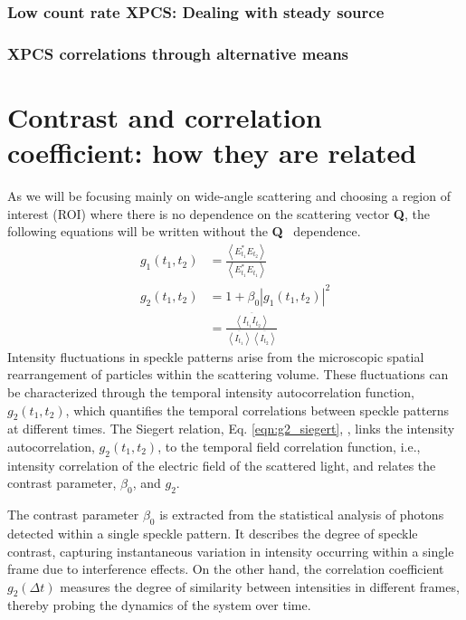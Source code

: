 \documentclass[11pt]{article}
\theoremstyle{definition}
\newcommand{\QQ}{\textbf{Q}}
\begin{document}
\subsubsection{Low count rate XPCS: Dealing with steady source}

\subsubsection{XPCS correlations through alternative means}
\section{Contrast and correlation coefficient: how they are related}
As we will be focusing mainly on wide-angle scattering and choosing a region of interest (ROI) where there is no dependence on the scattering vector \QQ, the following equations will be written without the \QQ~ dependence. 
\begin{align}
g_1(t_1, t_2) &= \frac{\left< E^*_{t_1} E_{t_2} \right>}{\left< E^*_{t_1} E_{t_1} \right>} \\
g_2(t_1, t_2)&= 1 + \beta_0 |g_1(t_1, t_2)|^2 \label{eqn:g2_siegert}\\
&= \frac{\overline{\left< I_{t_1} I_{t_2} \right>}}{\overline{\left< I_{t_1} \right>} \overline{\left< I_{t_2} \right>}} \label{eqn:g2_intensity} 
\end{align}
Intensity fluctuations in speckle patterns arise from the microscopic spatial rearrangement of particles within the scattering volume. These fluctuations can be characterized through the temporal intensity autocorrelation function, \( g_2(t_1, t_2) \), which quantifies the temporal correlations between speckle patterns at different times. The Siegert relation, Eq. \eqref{eqn:g2_siegert}, \cite{ferreira2020, jo_single_2023}, links the intensity autocorrelation, \( g_2(t_1, t_2) \), to the temporal field correlation function, i.e., intensity correlation of the electric field of the scattered light, and relates the contrast parameter, \(\beta_0\), and \( g_2 \). 

The contrast parameter \(\beta_0\) is extracted from the statistical analysis of photons detected within a single speckle pattern. It describes the degree of speckle contrast, capturing instantaneous variation in intensity occurring within a single frame due to interference effects. On the other hand, the correlation coefficient \( g_2(\Delta t) \) measures the degree of similarity between intensities in different frames, thereby probing the dynamics of the system over time.
\end{document}
